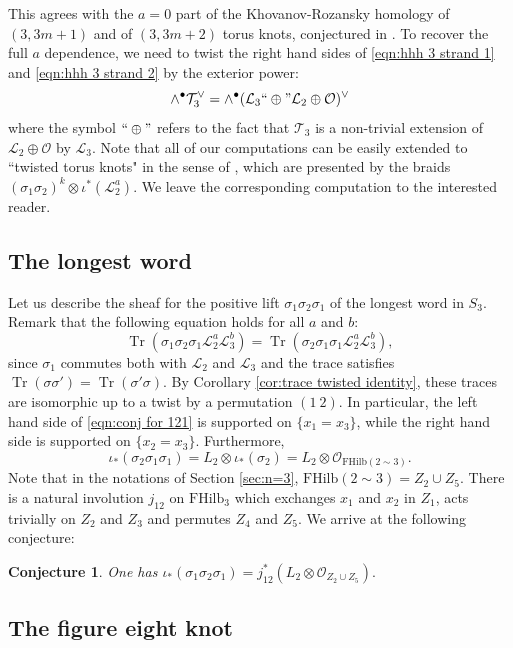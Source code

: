 \documentclass[12pt]{amsart}
\numberwithin{equation}{section}
\newtheorem{conjecture}[theorem]{Conjecture}
\theoremstyle{definition}
\theoremstyle{remark}
\DeclareMathOperator{\Tr}{Tr}
\newcommand{\CL}{\mathcal{L}}
\newcommand{\CO}{\mathcal{O}}
\newcommand{\CT}{\mathcal{T}}
\renewcommand{\1}{\mathbf{1}}
\newcommand{\FH}{\mathrm{FHilb}}
\begin{document}
This agrees with the $a=0$ part of the Khovanov-Rozansky homology of $(3,3m+1)$ and of $(3,3m+2)$ torus knots, conjectured in \cite[Section 5.2]{GORS}. To recover the full $a$ dependence, we need to twist the right hand sides of \eqref{eqn:hhh 3 strand 1} and \eqref{eqn:hhh 3 strand 2} by the exterior power:
$$
\wedge^\bullet \CT_3^\vee = \wedge^\bullet (\CL_3 ``\oplus" \CL_2 \oplus \CO)^\vee
$$
where the symbol $``\oplus"$ refers to the fact that $\CT_3$ is a non-trivial extension of $\CL_2 \oplus \CO$ by $\CL_3$. Note that all of our computations can be easily extended to ``twisted torus knots"  in the sense of \cite{CDW}, which are presented by the braids $(\sigma_1\sigma_2)^{k}\otimes \iota^* (\CL_2^{a} )$. We leave the corresponding computation to the interested reader.

\subsection{The longest word}
\label{sub:longest}

Let us describe the sheaf for the positive lift $\sigma_1\sigma_2\sigma_1$ of the longest word in $S_3$.  Remark that the following equation holds for all $a$ and $b$:
\begin{equation}
\label{eqn:conj for 121}
\Tr(\sigma_1\sigma_2\sigma_1\CL_2^{a}\CL_3^{b})=\Tr(\sigma_2\sigma_1\sigma_1\CL_2^{a}\CL_3^{b}),
\end{equation}
since $\sigma_1$ commutes both with $\CL_2$ and $\CL_3$ and the trace satisfies $\Tr(\sigma \sigma') = \Tr(\sigma'\sigma)$.  By Corollary \ref{cor:trace twisted identity}, these traces are isomorphic up to a twist by a permutation $(1\ 2)$. In particular, the left hand side of \eqref{eqn:conj for 121} is supported on $\{x_1=x_3\}$, while the right hand side is supported on $\{x_2=x_3\}$. Furthermore, 
$$
\iota_*(\sigma_2\sigma_1\sigma_1) = L_2\otimes \iota_*(\sigma_2)=L_2\otimes \CO_{\FH(2\sim 3)}.
$$
Note that in the notations of Section \ref{sec:n=3}, $\FH(2\sim 3)=Z_2\cup Z_5$.
There is a natural involution $j_{12}$ on $\FH_3$ which exchanges $x_1$ and $x_2$ in $Z_1$, acts trivially on $Z_2$ and $Z_3$ and permutes $Z_4$ and $Z_5$. We arrive at the following conjecture:

\begin{conjecture}
One has $\iota_*(\sigma_1\sigma_2\sigma_1)=j_{12}^{*}(L_2\otimes \CO_{Z_2\cup Z_5}).$
\end{conjecture}

\subsection{The figure eight knot}
\label{sub:figure eight}
\end{document}

